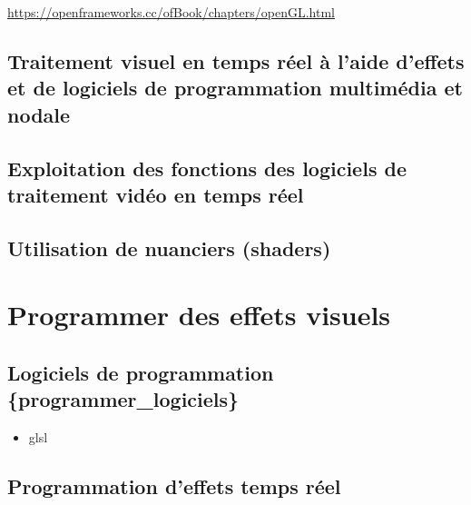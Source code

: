 \documentclass[
]{book}
\providecommand{\tightlist}{%
  \setlength{\itemsep}{0pt}\setlength{\parskip}{0pt}}
\begin{document}
\url{https://openframeworks.cc/ofBook/chapters/openGL.html}

\hypertarget{traitement-visuel-en-temps-ruxe9el-uxe0-laide-deffets-et-de-logiciels-de-programmation-multimuxe9dia-et-nodale}{%
\section{Traitement visuel en temps réel à l'aide d'effets et de logiciels de programmation multimédia et nodale}\label{traitement-visuel-en-temps-ruxe9el-uxe0-laide-deffets-et-de-logiciels-de-programmation-multimuxe9dia-et-nodale}}

\hypertarget{exploitation-des-fonctions-des-logiciels-de-traitement-viduxe9o-en-temps-ruxe9el}{%
\section{Exploitation des fonctions des logiciels de traitement vidéo en temps réel}\label{exploitation-des-fonctions-des-logiciels-de-traitement-viduxe9o-en-temps-ruxe9el}}

\hypertarget{utilisation-de-nuanciers-shaders}{%
\section{Utilisation de nuanciers (shaders)}\label{utilisation-de-nuanciers-shaders}}

\hypertarget{programmer}{%
\chapter{Programmer des effets visuels}\label{programmer}}

\hypertarget{logiciels-de-programmation-programmer_logiciels}{%
\section{Logiciels de programmation \{programmer\_logiciels\}}\label{logiciels-de-programmation-programmer_logiciels}}

\begin{itemize}
\tightlist
\item
  glsl
\end{itemize}

\hypertarget{programmation-deffets-temps-ruxe9el}{%
\section{Programmation d'effets temps réel}\label{programmation-deffets-temps-ruxe9el}}
\end{document}
